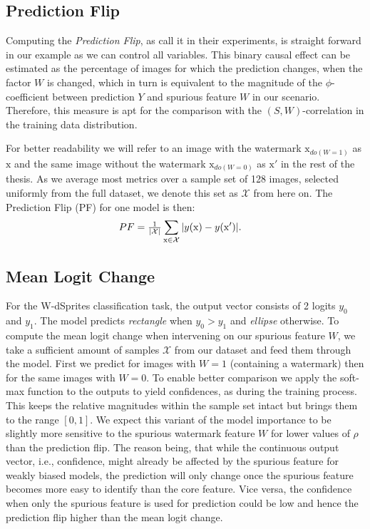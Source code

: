 \subsection{Prediction Flip}
Computing the \textit{Prediction Flip}, as \citeauthor{Sixt2022a} call it in their experiments, is straight forward in our example as we can control all variables. 
This binary causal effect can be estimated as the percentage of images for which the prediction changes, when the factor $W$ is changed, which in turn is equivalent to the magnitude of the $\phi$-coefficient between prediction $Y$ and spurious feature $W$ in our scenario. Therefore, this measure is apt for the comparison with the $(S,W)$-correlation in the training data distribution.

For better readability we will refer to an image with the watermark $\mathrm{x}_{do(W=1)}$ as $\mathrm{x}$ and the same image without the watermark $\mathrm{x}_{do(W=0)}$ as $\mathrm{x'}$ in the rest of the thesis. As we average most metrics over a sample set of 128 images, selected uniformly from the full dataset, we denote this set as $\mathcal{X}$ from here on. The Prediction Flip (PF) for one model is then:
\begin{align}
\displaystyle 
& PF =\tfrac{1}{|\mathcal{X}|} \sum_{\mathrm{x} \in \mathcal{X}} |y(\mathrm{x}) - y(\mathrm{x'}) |. 
\end{align}

\subsection{Mean Logit Change}
For the W-dSprites classification task, the output vector consists of 2 logits $y_0$ and $y_1$. The model predicts \textit{rectangle} when $y_0 > y_1$ and \textit{ellipse} otherwise. To compute the mean logit change when intervening on our spurious feature $W$, we take a sufficient amount of samples $\mathcal{X}$ from our dataset and feed them through the model. First we predict for images with $W=1$ (containing a watermark) then for the same images with $W=0$. 
To enable better comparison we apply the soft-max function to the outputs to yield confidences, as during the training process. This keeps the relative magnitudes within the sample set intact but brings them to the range $[0,1]$. 
We expect this variant of the model importance to be slightly more sensitive to the spurious watermark feature $W$ for lower values of $\rho$ than the prediction flip. The reason being, that while the continuous output vector, i.e., confidence, might already be affected by the spurious feature for weakly biased models, the prediction will only change once the spurious feature becomes more easy to identify than the core feature. Vice versa, the confidence when only the spurious feature is used for prediction could be low and hence the prediction flip higher than the mean logit change.

